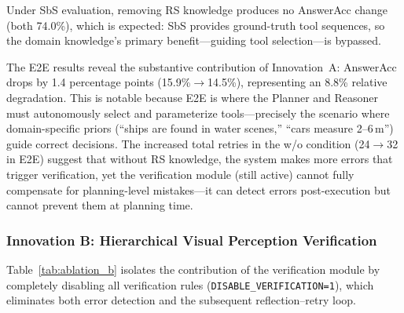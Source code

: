 \documentclass[journal]{IEEEtran}
\begin{document}
Under SbS evaluation, removing RS knowledge produces no AnswerAcc change (both 74.0\%), which is expected: SbS provides ground-truth tool sequences, so the domain knowledge's primary benefit---guiding tool selection---is bypassed.

The E2E results reveal the substantive contribution of Innovation~A: AnswerAcc drops by 1.4 percentage points (15.9\%$\rightarrow$14.5\%), representing an 8.8\% relative degradation.
This is notable because E2E is where the Planner and Reasoner must autonomously select and parameterize tools---precisely the scenario where domain-specific priors (``ships are found in water scenes,'' ``cars measure 2--6\,m'') guide correct decisions.
The increased total retries in the w/o condition (24$\rightarrow$32 in E2E) suggest that without RS knowledge, the system makes more errors that trigger verification, yet the verification module (still active) cannot fully compensate for planning-level mistakes---it can detect errors post-execution but cannot prevent them at planning time.

\subsubsection{Innovation B: Hierarchical Visual Perception Verification}

Table~\ref{tab:ablation_b} isolates the contribution of the verification module by completely disabling all verification rules (\texttt{DISABLE\_VERIFICATION=1}), which eliminates both error detection and the subsequent reflection--retry loop.

\begin{table}[t]
\centering
\caption{Ablation B: Effect of Hierarchical Verification. ``w/'' denotes the full SR\textsuperscript{2}A with all verification levels active; ``w/o'' disables all verification rules. Without verification, no errors are detected, so no retries or reflections occur. SbS evaluates on 273 GT tasks; E2E evaluates all 365 GT tasks.}
\label{tab:ablation_b}
\end{table}
\end{document}
